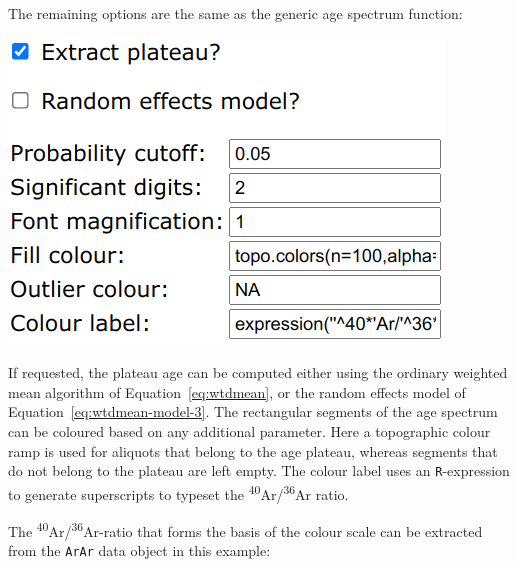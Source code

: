 \begin{refsection}
The remaining options are the same as the generic age spectrum
function:\\

\noindent\begin{minipage}[t]{.4\linewidth}
\strut\vspace*{-\baselineskip}\newline
\includegraphics[width=\linewidth]{../figures/ArArAgeSpectrumOtherOptions.png}\\
\end{minipage}
\begin{minipage}[t]{.6\linewidth}
  If requested, the plateau age can be computed either using the
  ordinary weighted mean algorithm of Equation~\ref{eq:wtdmean}, or
  the random effects model of Equation~\ref{eq:wtdmean-model-3}.  The
  rectangular segments of the age spectrum can be coloured based on
  any additional parameter. Here a topographic colour ramp is used for
  aliquots that belong to the age plateau, whereas segments that do
  not belong to the plateau are left empty. The colour label uses an
  \texttt{R}-expression to generate superscripts to typeset the
  \textsuperscript{40}Ar/\textsuperscript{36}Ar ratio.
\end{minipage}

The \textsuperscript{40}Ar/\textsuperscript{36}Ar-ratio that forms the
basis of the colour scale can be extracted from the \texttt{ArAr} data
object in this example:

  

\end{refsection}
